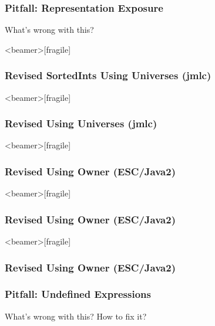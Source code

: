 \begin{frame}[fragile]
\frametitle{Pitfall: Representation Exposure}

\begin{question}
What's wrong with this? 

\rm


\end{question}
\end{frame}

\begin{frame}<beamer>[fragile]
\frametitle{Revised SortedInts Using Universes (jmlc)}


\end{frame}

\begin{frame}<beamer>[fragile]
\frametitle{Revised Using Universes (jmlc)}


\end{frame}

\begin{frame}<beamer>[fragile]
\frametitle{Revised Using Owner (ESC/Java2)}


\end{frame}

\begin{frame}<beamer>[fragile]
\frametitle{Revised Using Owner (ESC/Java2)}


\end{frame}

\begin{frame}<beamer>[fragile]
\frametitle{Revised Using Owner (ESC/Java2)}


\end{frame}

\begin{frame}
\frametitle{Pitfall: Undefined Expressions}
\begin{question}
What's wrong with this? How to fix it?

\rm

\end{question}
\end{frame}

